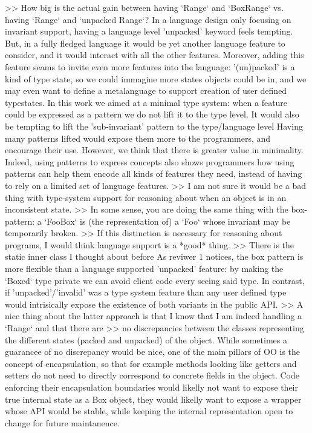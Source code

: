 >> How big is the actual gain between having `Range` and  `BoxRange` vs. having `Range` and `unpacked Range`?
In a language design only focusing on invariant support, having a language level 'unpacked' keyword feels tempting.
But, in a fully fledged language it would be yet another language feature to consider, and it would interact with all the other features.
Moreover, adding this feature seams to invite even more features into the language:
'(un)packed' is a kind of type state, so we could immagine more states objects could be in, and we may even want to define a metalanguage to support creation of user defined typestates.
In this work we aimed at a minimal type system: when a feature could be expressed as a pattern we do not lift it to the type level.
It would also be tempting to lift the 'sub-invariant' pattern to the type/language level
Having many patterns lifted would expose them more to the programmers, and encourage their use.
However, we think that there is greater value in minimality.
Indeed, using patterns to express concepts also shows programmers how using patterns can help them encode all kinds of features they need, instead of having to rely on a limited set of language features.
>> I am not sure it would be a bad thing with type-system support for reasoning about when an object is in an inconsistent state.
>> In some sense, you are doing the same thing with the box-pattern: a `FooBox` is (the representation of) a `Foo` whose invariant may be temporarily broken.
>> If this distinction is necessary for reasoning about programs, I would think language support is a *good* thing.
>> There is the static inner class I thought about before
As reviwer 1 notices, the box pattern is more flexible than a language supported 'unpacked' feature:
by making the `Boxed` type private we can avoid client code every seeing said type.
In contrast, if 'unpacked'/'invalid' was a type system feature than any user defined type would intrisically expose the existence of both variants in the public API.
>> A nice thing  about the latter approach is that I know that I am indeed  handling a `Range` and that there are
>> no discrepancies between the classes representing the different states (packed and  unpacked) of the object.
While sometimes a guarancee of no discrepancy would be nice, one of the main pillars of OO is the concept of encapsulation, so that
for example methods looking like getters and setters do not need to directly correspond to concrete fields in the object.
Code enforcing their encapsulation boundaries would likelly not want to expose their true internal state as a Box object, they would likelly want to expose a wrapper whose
API would be stable, while keeping the internal representation open to change for future maintanence.

